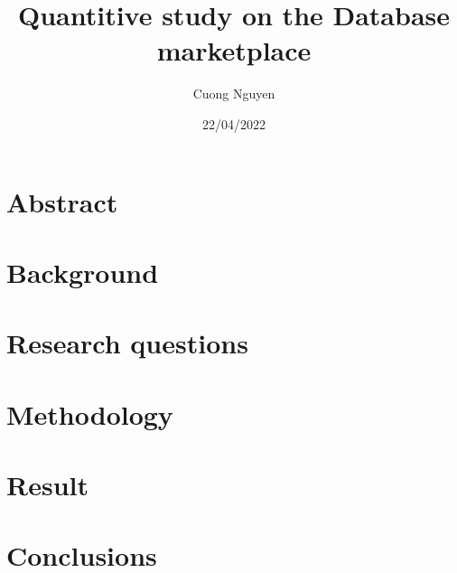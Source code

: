 \documentclass{article}
\title{Quantitive study on the Database marketplace}
\author{Cuong Nguyen}
\date{22/04/2022}
\begin{document}
    
\maketitle

\tableofcontents

\section{Abstract}\label{sec:abstract}

\section{Background}\label{sec:background}

\section{Research questions}\label{sec:research_questions}


\section{Methodology}\label{sec:method}


\section{Result}\label{sec:result}

\section{Conclusions}\label{sec:conclusion}

\printbibliography{}
\end{document}
